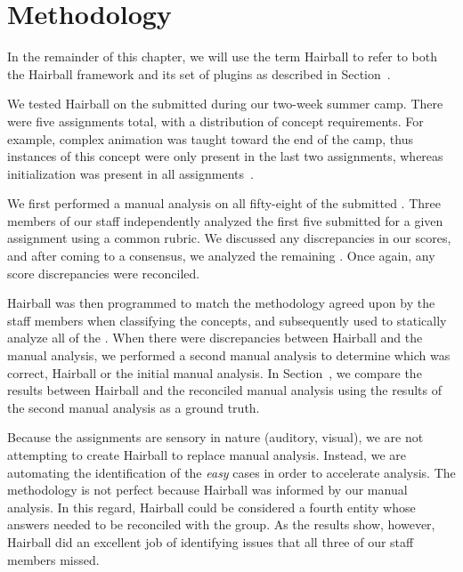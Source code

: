 \section{Methodology} 
In the remainder of this chapter, we will use the term Hairball to refer to
both the Hairball framework and its set of plugins as described in
Section~.

We tested Hairball on the  submitted during our two-week summer
camp.  There were five assignments total, with a distribution of concept
requirements. For example, complex animation was taught toward the end of the
camp, thus instances of this concept were only present in the last two
assignments, whereas initialization was present in all
assignments~\cite{Franklin:2013:SBO}.

We first performed a manual analysis on all fifty-eight of the submitted
.  Three members of our staff independently analyzed the first five
 submitted for a given assignment using a common rubric. We
discussed any discrepancies in our scores, and after coming to a consensus, we
analyzed the remaining . Once again, any score discrepancies were
reconciled.

Hairball was then programmed to match the methodology agreed upon by the staff
members when classifying the concepts, and subsequently used to statically
analyze all of the .  When there were discrepancies between
Hairball and the manual analysis, we performed a second manual analysis to
determine which was correct, Hairball or the initial manual analysis. In
Section~, we compare the results between Hairball and the
reconciled manual analysis using the results of the second manual analysis as a
ground truth.

Because the assignments are sensory in nature (auditory, visual), we are not
attempting to create Hairball to replace manual analysis.  Instead, we are
automating the identification of the \emph{easy} cases in order to accelerate
analysis.  The methodology is not perfect because Hairball was informed by our
manual analysis. In this regard, Hairball could be considered a fourth entity
whose answers needed to be reconciled with the group.  As the results show,
however, Hairball did an excellent job of identifying issues that all three of
our staff members missed.
